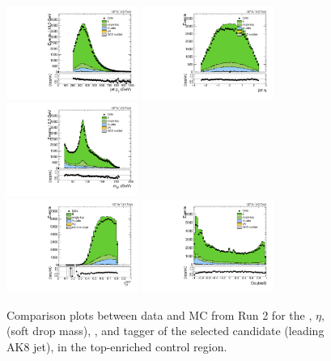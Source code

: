 \begin{figure}[htbp]
  \centering
  \includegraphics[width=0.3825\textwidth]{fig/analysisAppendix/CR_b1_allL_allP_allC_allD_Run2_lnujj_l2_pt.pdf}
  \includegraphics[width=0.3825\textwidth]{fig/analysisAppendix/CR_b1_allL_allP_allC_allD_Run2_lnujj_l2_eta.pdf}\\
  \includegraphics[width=0.3825\textwidth]{fig/analysisAppendix/CR_b1_allL_allP_allC_allD_Run2_mjet.pdf}\\
  \includegraphics[width=0.3825\textwidth]{fig/analysisAppendix/CR_b1_allL_allP_allC_allD_Run2_tau21DDT.pdf}
  \includegraphics[width=0.3825\textwidth]{fig/analysisAppendix/CR_b1_allL_allP_allC_allD_Run2_DoubleB.pdf}\\
  \caption{
    Comparison plots between data and MC from Run 2 for the \pt, $\eta$, \MJ (soft drop mass), \nsubjDDT, and \DoubleB tagger of the selected \Vhad candidate (leading AK8 jet), in the top-enriched control region.
  }
  \label{fig:CR_controlPlotsRun2_3}
\end{figure}


